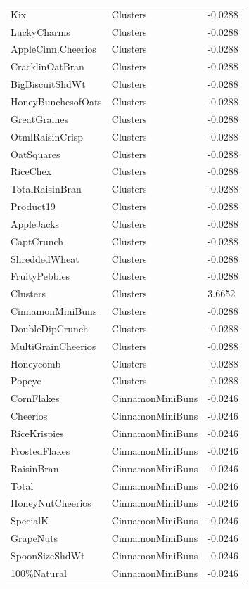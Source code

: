 \begin{table}[!htbp]
\begin{tabular}{lll}
Kix & Clusters & -0.0288
\\
LuckyCharms & Clusters & -0.0288
\\
AppleCinn.Cheerios & Clusters & -0.0288
\\
CracklinOatBran & Clusters & -0.0288
\\
BigBiscuitShdWt & Clusters & -0.0288
\\
HoneyBunchesofOats & Clusters & -0.0288
\\
GreatGraines & Clusters & -0.0288
\\
OtmlRaisinCrisp & Clusters & -0.0288
\\
OatSquares & Clusters & -0.0288
\\
RiceChex & Clusters & -0.0288
\\
TotalRaisinBran & Clusters & -0.0288
\\
Product19 & Clusters & -0.0288
\\
AppleJacks & Clusters & -0.0288
\\
CaptCrunch & Clusters & -0.0288
\\
ShreddedWheat & Clusters & -0.0288
\\
FruityPebbles & Clusters & -0.0288
\\
Clusters & Clusters & 3.6652
\\
CinnamonMiniBuns & Clusters & -0.0288
\\
DoubleDipCrunch & Clusters & -0.0288
\\
MultiGrainCheerios & Clusters & -0.0288
\\
Honeycomb & Clusters & -0.0288
\\
Popeye & Clusters & -0.0288
\\
CornFlakes & CinnamonMiniBuns & -0.0246
\\
Cheerios & CinnamonMiniBuns & -0.0246
\\
RiceKrispies & CinnamonMiniBuns & -0.0246
\\
FrostedFlakes & CinnamonMiniBuns & -0.0246
\\
RaisinBran & CinnamonMiniBuns & -0.0246
\\
Total & CinnamonMiniBuns & -0.0246
\\
HoneyNutCheerios & CinnamonMiniBuns & -0.0246
\\
SpecialK & CinnamonMiniBuns & -0.0246
\\
GrapeNuts & CinnamonMiniBuns & -0.0246
\\
SpoonSizeShdWt & CinnamonMiniBuns & -0.0246
\\
100\%Natural & CinnamonMiniBuns & -0.0246
\\

\end{tabular}
\end{table}
